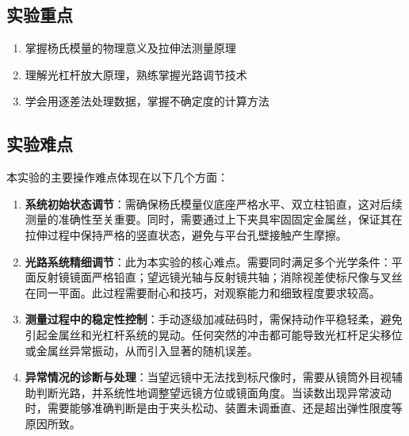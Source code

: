 \documentclass[]{../template/Report}%
\begin{document}
\subsection{实验重点}
\begin{enumerate}
\item 掌握杨氏模量的物理意义及拉伸法测量原理
\item 理解光杠杆放大原理，熟练掌握光路调节技术
\item 学会用逐差法处理数据，掌握不确定度的计算方法
\end{enumerate}

\subsection{实验难点}
本实验的主要操作难点体现在以下几个方面：

\begin{enumerate}
\item \textbf{系统初始状态调节}：需确保杨氏模量仪底座严格水平、双立柱铅直，这对后续测量的准确性至关重要。同时，需要通过上下夹具牢固固定金属丝，保证其在拉伸过程中保持严格的竖直状态，避免与平台孔壁接触产生摩擦。

\item \textbf{光路系统精细调节}：此为本实验的核心难点。需要同时满足多个光学条件：平面反射镜镜面严格铅直；望远镜光轴与反射镜共轴；消除视差使标尺像与叉丝在同一平面。此过程需要耐心和技巧，对观察能力和细致程度要求较高。

\item \textbf{测量过程中的稳定性控制}：手动逐级加减砝码时，需保持动作平稳轻柔，避免引起金属丝和光杠杆系统的晃动。任何突然的冲击都可能导致光杠杆足尖移位或金属丝异常振动，从而引入显著的随机误差。

\item \textbf{异常情况的诊断与处理}：当望远镜中无法找到标尺像时，需要从镜筒外目视辅助判断光路，并系统性地调整望远镜方位或镜面角度。当读数出现异常波动时，需要能够准确判断是由于夹头松动、装置未调垂直、还是超出弹性限度等原因所致。
\end{enumerate}
\end{document}
